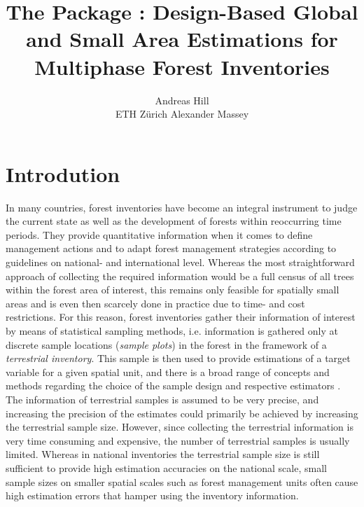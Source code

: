 \documentclass[article]{jss}
\author{Andreas Hill \\ETH Z\"urich \And 
        Alexander Massey}
\title{The \proglang{R} Package \pkg{forestinventory}: Design-Based Global and Small Area Estimations for Multiphase Forest Inventories}
\begin{document}






\section{Introdution}
\label{sec:intro}

In many countries, forest inventories have become an integral instrument to judge the current state as well as the development of forests within reoccurring time periods. They provide quantitative information when it comes to define management actions and to adapt forest management strategies according to guidelines on national- and international level. Whereas the most straightforward approach of collecting the required information would be a full census of all trees within the forest area of interest, this remains only feasible for spatially small areas and is even then scarcely done in practice due to time- and cost restrictions. For this reason, forest inventories gather their information of interest by means of statistical sampling methods, i.e. information is gathered only at discrete sample locations (\textit{sample plots}) in the forest in the framework of a \textit{terrestrial inventory}. This sample is then used to provide estimations of a target variable for a given spatial unit, and there is a broad range of concepts and methods regarding the choice of the sample design and respective estimators \citep{gregoire2007, kohl2006, schreuder1993, mandallaz2008}. The information of terrestrial samples is assumed to be very precise, and increasing the precision of the estimates could primarily be achieved by increasing the terrestrial sample size. However, since collecting the terrestrial information is very time consuming and expensive, the number of terrestrial samples is usually limited. Whereas in national inventories the terrestrial sample size is still sufficient to provide high estimation accuracies on the national scale, small sample sizes on smaller spatial scales such as forest management units often cause high estimation errors that hamper using the inventory information.\par
\end{document}
